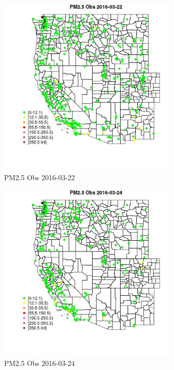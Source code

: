 \begin{figure} 
\centering  
\includegraphics[width=0.77\textwidth]{Code_Outputs/Report_ML_input_PM25_Step4_part_e_de_duplicated_aveswNAs_MapObsPM25_Obs2016-03-22.jpg} 
\caption{\label{fig:Report_ML_input_PM25_Step4_part_e_de_duplicated_aveswNAsMapObsPM25_Obs2016-03-22}PM2.5 Obs 2016-03-22} 
\end{figure} 
 

\begin{figure} 
\centering  
\includegraphics[width=0.77\textwidth]{Code_Outputs/Report_ML_input_PM25_Step4_part_e_de_duplicated_aveswNAs_MapObsPM25_Obs2016-03-24.jpg} 
\caption{\label{fig:Report_ML_input_PM25_Step4_part_e_de_duplicated_aveswNAsMapObsPM25_Obs2016-03-24}PM2.5 Obs 2016-03-24} 
\end{figure} 
 

